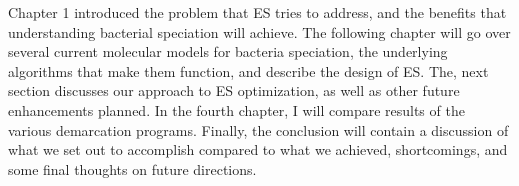 Chapter 1 introduced the problem that ES tries to address, and the benefits that understanding bacterial speciation will achieve.
The following chapter will go over several current molecular models for bacteria speciation, the underlying algorithms that make them function, and describe the design of ES.
The, next section discusses our approach to ES optimization, as well as other future enhancements planned.
In the fourth chapter, I will compare results of the various demarcation programs.
Finally, the conclusion will contain a discussion of what we set out to accomplish compared to what we achieved, shortcomings, and some final thoughts on future directions.

